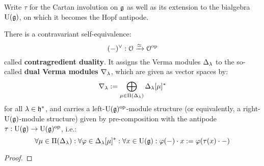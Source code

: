        \begin{theorem} \label{theorem: dual_verma_modules}
            Write $\tau$ for the Cartan involution on $\mathfrak{g}$ as well as its extension to the bialgebra $\mathrm{U}(\mathfrak{g})$, on which it becomes the Hopf antipode.
            
            There is a contravariant self-equivalence:
                $$(-)^{\vee}: \mathcal{O} \xrightarrow[]{\simeq} \mathcal{O}^{\mathrm{op}}$$
            called \textbf{contragredient duality}. It assigns the Verma modules $\Delta_{\lambda}$ to the so-called \textbf{dual Verma modules} $\nabla_{\lambda}$, which are given as vector spaces by:
                $$\nabla_{\lambda} := \bigoplus_{\mu \in \Pi(\Delta_{\lambda})} \Delta_{\lambda}[\mu]^*$$
            for all $\lambda \in \mathfrak{h}^*$, and carries a left-$\mathrm{U}(\mathfrak{g})^{\mathrm{op}}$-module structure (or equivalently, a right-$\mathrm{U}(\mathfrak{g})$-module structure) given by pre-composition with the antipode $\tau: \mathrm{U}(\mathfrak{g}) \to \mathrm{U}(\mathfrak{g})^{\mathrm{op}}$, i.e.:
                $$\forall \mu \in \Pi(\Delta_{\lambda}): \forall \varphi \in \Delta_{\lambda}[\mu]^*: \forall x \in \mathrm{U}(\mathfrak{g}): \varphi(-) \cdot x := \varphi( \tau(x) \cdot - )$$
        \end{theorem}
            \begin{proof}
                
            \end{proof}
